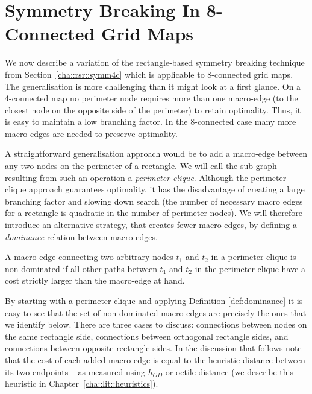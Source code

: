 \section{Symmetry Breaking In 8-Connected Grid Maps}
\label{cha::rsr::symm8c}
We now describe a variation of the rectangle-based symmetry breaking technique
from Section~\ref{cha::rsr::symm4c} which is applicable to 8-connected grid
maps.  The generalisation is more challenging than it might look at a first
glance.  On a 4-connected map no perimeter node requires more than one
macro-edge (to the closest node on the opposite side of the perimeter) to
retain optimality.  Thus, it is easy to maintain a low branching factor.  In
the 8-connected case many more macro edges are needed to preserve optimality.

A straightforward generalisation approach would be to add a macro-edge between
any two nodes on the perimeter of a rectangle.  We will call the sub-graph
resulting from such an operation a \emph{perimeter clique}.  Although the
perimeter clique approach guarantees optimality, it has the disadvantage of
creating a large branching factor and slowing down search (the number of
necessary macro edges for a rectangle is quadratic in the number of perimeter
nodes).  We will therefore introduce an alternative strategy, that creates
fewer macro-edges, by defining a \emph{dominance} relation between
macro-edges.

\begin{definition}
\label{def:dominance}
A macro-edge connecting two arbitrary nodes $t_1$ and $t_2$ in a perimeter
clique is non-dominated if all other paths between $t_1$ and $t_2$ in the
perimeter clique have a cost strictly larger than the macro-edge at hand.
\end{definition}

By starting with a perimeter clique and applying Definition
\ref{def:dominance} it is easy to see that the set of non-dominated
macro-edges are precisely the ones that we identify below.  There are three
cases to discuss: connections between nodes on the same rectangle side,
connections between orthogonal rectangle sides, and connections between
opposite rectangle sides.  In the discussion that follows note that the cost
of each added macro-edge is equal to the heuristic distance between its two
endpoints -- as measured using $h_{OD}$ or octile distance 
(we describe this heuristic in Chapter~\ref{cha::lit::heuristics}).

